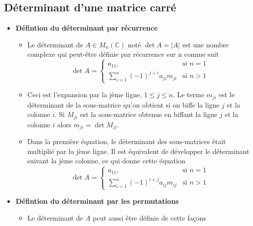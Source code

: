 \subsection*{Déterminant d'une matrice carré}
\begin{itemize}
    \item[] \textbf{Défintion du déterminant par récurrence} \begin{itemize}
              \item[] Le déterminant de $A \in M_n(\mathbb{C})$ noté $\det A = |A|$ est une nombre complexe
                    qui peut-être définie par récurrence sur n comme suit \begin{equation*}
                        \det A = \begin{cases}
                            a_{11},                                   & \text{si } n = 1 \\
                            \sum_{i = 1}^{n} (-1)^{j + i}a_{ji}m_{ji} & \text{si } n > 1
                        \end{cases}
                    \end{equation*}
              \item[] Ceci est l'expansion par la jème ligne, $1 \leq j \leq n$. Le terme $m_{ji}$
                    est le déterminant de la sous-matrice qu'on obtient si on biffe la ligne $j$ et la
                    colonne $i$. Si $M_{ji}$ est la sous-matrice obtenue en biffant la ligne $j$ et
                    la colonne $i$ alors $m_{ji} = \det M_{ji}$.
              \item[] Dans la première équation, le déterminant des sous-matrices était multiplié par la jème ligne. Il est
                    équivalent de développer le déterminant suivant la jème colonne, ce qui donne cette équation \begin{equation*}
                        \det A = \begin{cases}
                            a_{11},                                   & \text{si } n = 1 \\
                            \sum_{i = 1}^{n} (-1)^{i + j}a_{ij}m_{ij} & \text{si } n > 1
                        \end{cases}
                    \end{equation*}
          \end{itemize}
    \item[] \textbf{Défintion du déterminant par les permutations} \begin{itemize}
              \item[] Le déterminant de $A$ peut aussi être définie de cette façons \begin{equation*}

\end{equation*}
\end{itemize}
\end{itemize}
